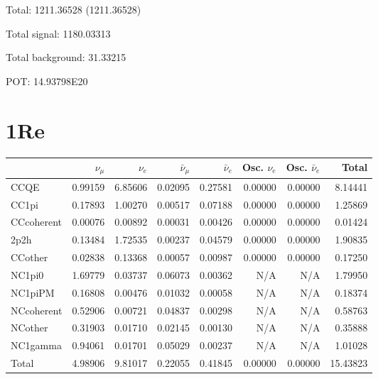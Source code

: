\documentclass[10pt,a4paper]{article}
\begin{document}
Total: 1211.36528    (1211.36528)


Total signal: 1180.03313


Total background: 31.33215

POT: 14.93798E20


\section*{1Re}
\begin{tabular} { | l ||r | r | r | r | r | r | | r | }
\hline
              & $\nu_\mu$            & $\nu_e$              & $\bar{\nu}_{\mu}$    & $\bar{\nu}_{e}$      & Osc. $\nu_e$         & Osc. $\bar{\nu}_{e}$ & Total                \\ \hline\hline
 CCQE         & 0.99159              & 6.85606              & 0.02095              & 0.27581              & 0.00000              & 0.00000              & 8.14441              \\ \hline
 CC1pi        & 0.17893              & 1.00270              & 0.00517              & 0.07188              & 0.00000              & 0.00000              & 1.25869              \\ \hline
 CCcoherent   & 0.00076              & 0.00892              & 0.00031              & 0.00426              & 0.00000              & 0.00000              & 0.01424              \\ \hline
 2p2h         & 0.13484              & 1.72535              & 0.00237              & 0.04579              & 0.00000              & 0.00000              & 1.90835              \\ \hline
 CCother      & 0.02838              & 0.13368              & 0.00057              & 0.00987              & 0.00000              & 0.00000              & 0.17250              \\ \hline
 NC1pi0       & 1.69779              & 0.03737              & 0.06073              & 0.00362              & N/A                  & N/A                  & 1.79950              \\ \hline
 NC1piPM      & 0.16808              & 0.00476              & 0.01032              & 0.00058              & N/A                  & N/A                  & 0.18374              \\ \hline
 NCcoherent   & 0.52906              & 0.00721              & 0.04837              & 0.00298              & N/A                  & N/A                  & 0.58763              \\ \hline
 NCother      & 0.31903              & 0.01710              & 0.02145              & 0.00130              & N/A                  & N/A                  & 0.35888              \\ \hline
 NC1gamma     & 0.94061              & 0.01701              & 0.05029              & 0.00237              & N/A                  & N/A                  & 1.01028              \\ \hline
\hline
 Total        & 4.98906              & 9.81017              & 0.22055              & 0.41845              & 0.00000              & 0.00000              & 15.43823             \\ \hline

\end{tabular}
\end{document}
